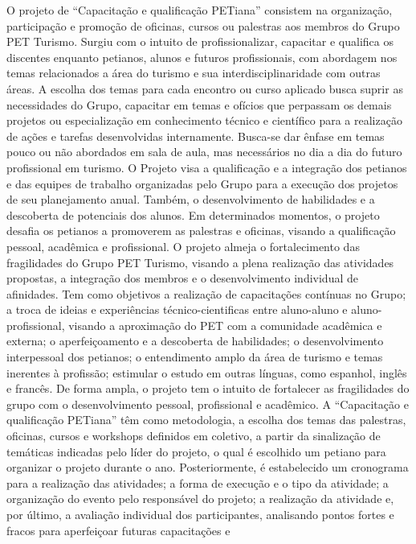 O projeto de “Capacitação e qualificação PETiana” consistem na organização, participação e 
promoção de oficinas, cursos ou palestras aos membros do Grupo PET Turismo. Surgiu com o 
intuito de profissionalizar, capacitar e qualifica os discentes enquanto petianos, alunos e futuros 
profissionais, com abordagem nos temas relacionados a área do turismo e sua interdisciplinaridade 
com outras áreas. A escolha dos temas para cada encontro ou curso aplicado busca suprir as 
necessidades do Grupo, capacitar em temas e ofícios que perpassam os demais projetos ou 
especialização em conhecimento técnico e científico para a realização de ações e tarefas 
desenvolvidas internamente. Busca-se dar ênfase em temas pouco ou não abordados em sala de 
aula, mas necessários no dia a dia do futuro profissional em turismo. O Projeto visa a qualificação 
e a integração dos petianos e das equipes de trabalho organizadas pelo Grupo para a execução dos 
projetos de seu planejamento anual. Também, o desenvolvimento de habilidades e a descoberta de 
potenciais dos alunos. Em determinados momentos, o projeto desafia os petianos a promoverem 
as palestras e oficinas, visando a qualificação pessoal, acadêmica e profissional. O projeto almeja 
o fortalecimento das fragilidades do Grupo PET Turismo, visando a plena realização das 
atividades propostas, a integração dos membros e o desenvolvimento individual de afinidades. 
Tem como objetivos a realização de capacitações contínuas no Grupo; a troca de ideias e 
experiências técnico-cientificas entre aluno-aluno e aluno-profissional, visando a aproximação do 
PET com a comunidade acadêmica e externa; o aperfeiçoamento e a descoberta de habilidades; o 
desenvolvimento interpessoal dos petianos; o entendimento amplo da área de turismo e temas 
inerentes à profissão; estimular o estudo em outras línguas, como espanhol, inglês e francês. De 
forma ampla, o projeto tem o intuito de fortalecer as fragilidades do grupo com o desenvolvimento 
pessoal, profissional e acadêmico. A “Capacitação e qualificação PETiana” têm como 
metodologia, a escolha dos temas das palestras, oficinas, cursos e workshops definidos em 
coletivo, a partir da sinalização de temáticas indicadas pelo líder do projeto, o qual é escolhido um 
petiano para organizar o projeto durante o ano. Posteriormente, é estabelecido um cronograma 
para a realização das atividades; a forma de execução e o tipo da atividade; a organização do 
evento pelo responsável do projeto; a realização da atividade e, por último, a avaliação individual 
dos participantes, analisando pontos fortes e fracos para aperfeiçoar futuras capacitações e 
